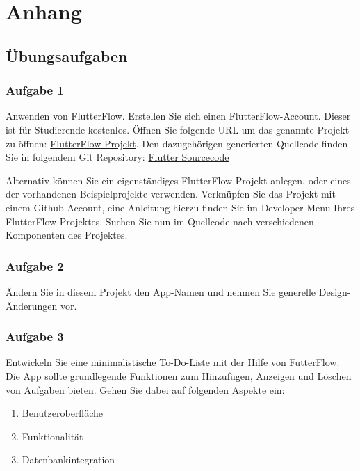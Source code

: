 \documentclass[acmtog, language=ngerman]{acmart}
\begin{document}




\appendix

\section{Anhang}

\subsection{Übungsaufgaben}
\subsubsection{Aufgabe 1}
Anwenden von FlutterFlow.
Erstellen Sie sich einen FlutterFlow-Account. Dieser ist für Studierende kostenlos. Öffnen Sie folgende URL um das genannte Projekt zu öffnen: \href{https://app.flutterflow.io/project/te-chi-chri-9rmiar?tab=uiBuilder&page=products}{FlutterFlow Projekt}.
Den dazugehörigen generierten Quellcode finden Sie in folgendem Git Repository: \href{https://github.com/Beleg-12-Low-Code-Ansatze/abgabe}{Flutter Sourcecode}

Alternativ können Sie ein eigenständiges FlutterFlow Projekt anlegen, oder eines der vorhandenen Beispielprojekte verwenden. Verknüpfen Sie das Projekt mit einem Github Account, eine Anleitung hierzu finden Sie im Developer Menu Ihres FlutterFlow Projektes. 
Suchen Sie nun im Quellcode nach verschiedenen Komponenten des Projektes.

\subsubsection{Aufgabe 2}
Ändern Sie in diesem Projekt den App-Namen und nehmen Sie generelle Design-Änderungen vor.

\subsubsection{Aufgabe 3}
Entwickeln Sie eine minimalistische To-Do-Liste mit der Hilfe von FutterFlow. Die App sollte grundlegende Funktionen zum Hinzufügen, Anzeigen und Löschen von Aufgaben bieten.
Gehen Sie dabei auf folgenden Aspekte ein:
\begin{enumerate}
    \item Benutzeroberfläche
    \item Funktionalität
    \item Datenbankintegration
\end{enumerate}
\end{document}

